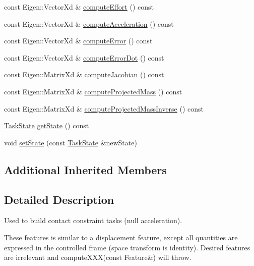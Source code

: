 \begin{DoxyCompactItemize}
\item 
const Eigen\+::\+Vector\+Xd \& \hyperlink{classocra_1_1ContactConstraintFeature_a84b467c5da2810bef8a76525e617ad2d}{compute\+Effort} () const
\item 
const Eigen\+::\+Vector\+Xd \& \hyperlink{classocra_1_1ContactConstraintFeature_a8537fa220270cf526014f0c4f5e6ea75}{compute\+Acceleration} () const
\item 
const Eigen\+::\+Vector\+Xd \& \hyperlink{classocra_1_1ContactConstraintFeature_ae846fba34c59502db6cf0a0dac0e6be3}{compute\+Error} () const
\item 
const Eigen\+::\+Vector\+Xd \& \hyperlink{classocra_1_1ContactConstraintFeature_afbe828f952c7583b690e394efd05423f}{compute\+Error\+Dot} () const
\item 
const Eigen\+::\+Matrix\+Xd \& \hyperlink{classocra_1_1ContactConstraintFeature_aa3c6131d9c4c815e9e9ec5ab50407b21}{compute\+Jacobian} () const
\item 
const Eigen\+::\+Matrix\+Xd \& \hyperlink{classocra_1_1ContactConstraintFeature_ab926340d6c6d00b1358ae99432e15398}{compute\+Projected\+Mass} () const
\item 
const Eigen\+::\+Matrix\+Xd \& \hyperlink{classocra_1_1ContactConstraintFeature_a78ba3452b7ad08dae7a266b0334aaa5d}{compute\+Projected\+Mass\+Inverse} () const
\item 
\hyperlink{classocra_1_1TaskState}{Task\+State} \hyperlink{classocra_1_1ContactConstraintFeature_a4a156de21fba41f54c2927232173d334}{get\+State} () const
\item 
void \hyperlink{classocra_1_1ContactConstraintFeature_a1bbc7ca568a64aed7704118b8eeaf6d1}{set\+State} (const \hyperlink{classocra_1_1TaskState}{Task\+State} \&new\+State)
\end{DoxyCompactItemize}
\subsection*{Additional Inherited Members}


\subsection{Detailed Description}
Used to build contact constraint tasks (null acceleration). 

These features is similar to a displacement feature, except all quantities are expressed in the controlled frame (space transform is identity). Desired features are irrelevant and compute\+X\+X\+X(const Feature\&) will throw. 

